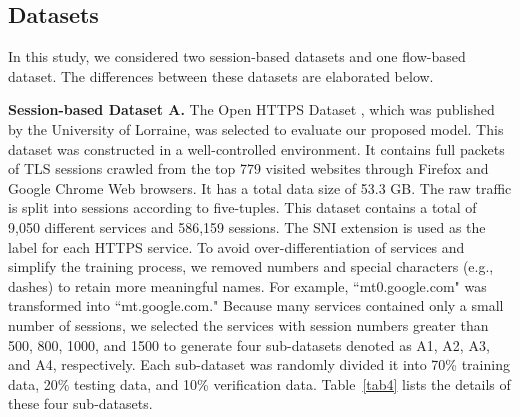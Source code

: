 \documentclass[preprint,12pt]{elsarticle}
\begin{document}
\subsection{Datasets} \label{sec: datasets}
In this study, we considered two session-based datasets and one flow-based dataset. The differences between these datasets are elaborated below.

\textbf{Session-based Dataset A.} The Open HTTPS Dataset \cite{shbair2016}, which was published by the University of Lorraine, was selected to evaluate our proposed model. This dataset was constructed in a well-controlled environment. It contains full packets of TLS sessions crawled from the top 779 visited websites through Firefox and Google Chrome Web browsers. It has a total data size of 53.3 GB. The raw traffic is split into sessions according to five-tuples. 
This dataset contains a total of 9,050 different services and 586,159 sessions. The SNI extension is used as the label for each HTTPS service. To avoid over-differentiation of services and simplify the training process, we removed numbers and special characters (e.g., dashes) to retain more meaningful names. For example, ``mt0.google.com" was transformed into ``mt.google.com." Because many services contained only a small number of sessions, we selected the services with session numbers greater than 500, 800, 1000, and 1500 to generate four sub-datasets denoted as A1, A2, A3, and A4, respectively. Each sub-dataset was randomly divided it into 70\% training data, 20\% testing data, and 10\% verification data. Table~\ref{tab4} lists the details of these four sub-datasets.


\begin{table}[h]
\centering
\caption{Sub-datasets of Dataset A.}
\label{tab4}
\end{table}
\end{document}
